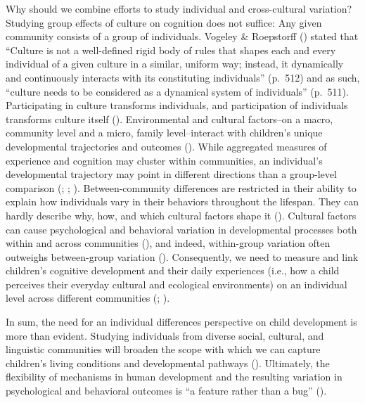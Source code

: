 \documentclass[
]{scrbook}
\begin{document}
Why should we combine efforts to study individual and cross-cultural variation? Studying group effects of culture on cognition does not suffice: Any given community consists of a group of individuals. Vogeley \& Roepstorff () stated that ``Culture is not a well-defined rigid body of rules that shapes each and every individual of a given culture in a similar, uniform way; instead, it dynamically and continuously interacts with its constituting individuals'' (p.~512) and as such, ``culture needs to be considered as a dynamical system of individuals'' (p.~511). Participating in culture transforms individuals, and participation of individuals transforms culture itself (). Environmental and cultural factors\thinspace --\thinspace on a macro, community level and a micro, family level\thinspace --\thinspace interact with children's unique developmental trajectories and outcomes (). While aggregated measures of experience and cognition may cluster within communities, an individual's developmental trajectory may point in different directions than a group-level comparison (; ; ). Between-community differences are restricted in their ability to explain how individuals vary in their behaviors throughout the lifespan. They can hardly describe why, how, and which cultural factors shape it (). Cultural factors can cause psychological and behavioral variation in developmental processes both within and across communities (), and indeed, within-group variation often outweighs between-group variation (). Consequently, we need to measure and link children's cognitive development and their daily experiences (i.e., how a child perceives their everyday cultural and ecological environments) on an individual level across different communities (; ).

In sum, the need for an individual differences perspective on child development is more than evident. Studying individuals from diverse social, cultural, and linguistic communities will broaden the scope with which we can capture children's living conditions and developmental pathways (). Ultimately, the flexibility of mechanisms in human development and the resulting variation in psychological and behavioral outcomes is ``a feature rather than a bug'' ().
\end{document}
